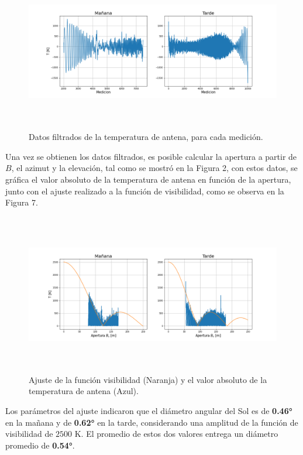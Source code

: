\documentclass[letterpaper,oneside]{article}
\begin{document}
\begin{figure}
  \centering
  \includegraphics[height=7cm]{../graficos/cleandata.png}
  \caption{Datos filtrados de la temperatura de antena, para cada medición.}
\end{figure}

Una vez se obtienen los datos filtrados, es posible calcular la apertura a partir de $B$, el azimut y la elevación, tal como se mostró en la Figura 2, con estos datos, se gráfica el valor absoluto de la temperatura de antena en función de la apertura, junto con el ajuste realizado a la función de visibilidad, como se observa en la Figura 7.

\begin{figure}
  \centering
  \includegraphics[height=7cm]{../graficos/ajuste.png}
  \caption{Ajuste de la función visibilidad (Naranja) y el valor absoluto de la temperatura de antena (Azul).}
\end{figure}

Los parámetros del ajuste indicaron que el diámetro angular del Sol es de \textbf{0.46°} en la mañana y de \textbf{0.62°} en la tarde, considerando una amplitud de la función de visibilidad de $2500$ K. El promedio de estos dos valores entrega un diámetro promedio de \textbf{0.54°}.
\end{document}
